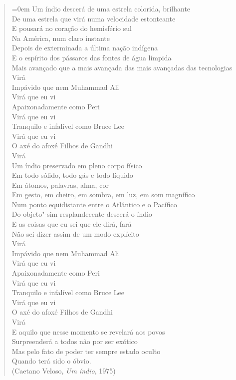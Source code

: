 \begin{quote}\parindent=0em
Um índio descerá de uma estrela colorida, brilhante\\
De uma estrela que virá numa velocidade estonteante\\
E pousará no coração do hemisfério sul\\
Na América, num claro instante\\
Depois de exterminada a última nação indígena\\
E o espírito dos pássaros das fontes de água límpida\\
Mais avançado que a mais avançada das mais avançadas das tecnologias\\
Virá\\
Impávido que nem Muhammad Ali\\
Virá que eu vi\\
Apaixonadamente como Peri\\
Virá que eu vi\\
Tranquilo e infalível como Bruce Lee\\
Virá que eu vi\\
O axé do afoxé Filhos de Gandhi\\
Virá\\
Um índio preservado em pleno corpo físico\\
Em todo sólido, todo gás e todo líquido\\
Em átomos, palavras, alma, cor\\
Em gesto, em cheiro, em sombra, em luz, em som magnífico\\
Num ponto equidistante entre o Atlântico e o Pacífico\\
Do objeto"-sim resplandecente descerá o índio\\
E as coisas que eu sei que ele dirá, fará\\
Não sei dizer assim de um modo explícito\\
Virá\\
Impávido que nem Muhammad Ali\\
Virá que eu vi\\
Apaixonadamente como Peri\\
Virá que eu vi\\
Tranquilo e infalível como Bruce Lee\\
Virá que eu vi\\
O axé do afoxé Filhos de Gandhi\\
Virá\\
E aquilo que nesse momento se revelará aos povos\\
Surpreenderá a todos não por ser exótico\\
Mas pelo fato de poder ter sempre estado oculto\\
Quando terá sido o óbvio.\\
(Caetano Veloso, \emph{Um índio}, 1975)
\end{quote}

